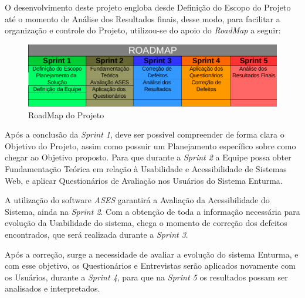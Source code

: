 	
	O desenvolvimento deste projeto engloba desde Definição do Escopo do Projeto até o momento de Análise dos Resultados finais, desse modo, para facilitar a organização e controle do Projeto, utilizou-se do apoio do \textit{RoadMap} a seguir:
	
	\begin{figure}[H]
		\centering
		\includegraphics[width=1\textwidth]{imagens/roadmap}
		\caption{RoadMap do Projeto}
		\label{img:roadmap}
	\end{figure}

	Após a conclusão da \textit{Sprint 1}, deve ser possível compreender de forma clara o Objetivo do Projeto, assim como possuir um Planejamento específico sobre como chegar ao Objetivo proposto. Para que durante a \textit{Sprint 2} a Equipe possa obter Fundamentação Teórica em relação à Usabilidade e Acessibilidade de Sistemas Web, e aplicar Questionários de Avaliação nos Usuários do Sistema Enturma.

	A utilização do software \textit{ASES} garantirá a Avaliação da Acessibilidade do Sistema, ainda na \textit{Sprint 2}. Com a obtenção de toda a informação necessária para evolução da Usabilidade do sistema, chega o momento de correção dos defeitos encontrados, que será realizada durante a \textit{Sprint 3}.

	Após a correção, surge a necessidade de avaliar a evolução do sistema Enturma, e com esse objetivo, os Questionários e Entrevistas serão aplicados novamente com os Usuários, durante a \textit{Sprint 4}, para que na \textit{Sprint 5} os resultados possam ser analisados e interpretados.